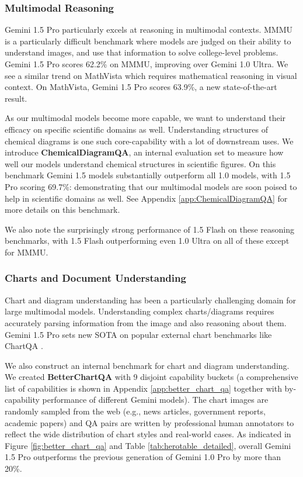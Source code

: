 \subsubsection{Multimodal Reasoning}
\label{sec:multimodal_reasoning}
Gemini 1.5 Pro particularly excels at reasoning in multimodal contexts. MMMU \citep{mmmu} is a particularly difficult benchmark where models are judged on their ability to understand images, and use that information to solve college-level problems. Gemini 1.5 Pro scores 62.2\% on MMMU, improving over Gemini 1.0 Ultra. We see a similar trend on MathVista which requires mathematical reasoning in visual context. On MathVista, Gemini 1.5 Pro scores 63.9\%, a new state-of-the-art result.

As our multimodal models become more capable, we want to understand their efficacy on specific scientific domains as well. Understanding structures of chemical diagrams is one such core-capability with a lot of downstream uses. We introduce \textbf{ChemicalDiagramQA}, an internal evaluation set to measure how well our models understand chemical structures in scientific figures. On this benchmark Gemini 1.5 models substantially outperform all 1.0 models, with 1.5 Pro scoring 69.7\%: demonstrating that our multimodal models are soon poised to help in scientific domains as well. See Appendix \ref{app:ChemicalDiagramQA} for more details on this benchmark.

We also note the surprisingly strong performance of 1.5 Flash on these reasoning benchmarks, with 1.5 Flash outperforming even 1.0 Ultra on all of these except for MMMU. 

\subsubsection{Charts and Document Understanding}
\label{sec:chart_doc}

Chart and diagram understanding has been a particularly challenging domain for large multimodal models. Understanding complex charts/diagrams requires accurately parsing information from the image and also reasoning about them. Gemini 1.5 Pro sets new SOTA on popular external chart benchmarks like ChartQA \citep{chartqa}.

We also construct an internal benchmark for chart and diagram understanding. We created \textbf{BetterChartQA} with 9 disjoint capability buckets (a comprehensive list of capabilities is shown in Appendix \ref{app:better_chart_qa} together with by-capability performance of different Gemini models). The chart images are randomly sampled from the web (e.g., news articles, government reports, academic papers) and QA pairs are written by professional human annotators to reflect the wide distribution of chart styles and real-world cases. As indicated in Figure \ref{fig:better_chart_qa} and Table \ref{tab:herotable_detailed}, overall Gemini 1.5 Pro outperforms the previous generation of Gemini 1.0 Pro by more than 20\%.

